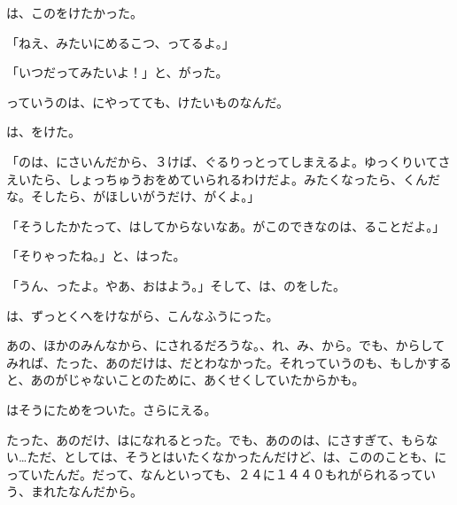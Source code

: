 は、このをけたかった。

「ねえ、みたいにめるこつ、ってるよ。」

「いつだってみたいよ！」と、がった。

っていうのは、にやってても、けたいものなんだ。

は、をけた。

「のは、にさいんだから、３けば、ぐるりっとってしまえるよ。ゆっくりいてさえいたら、しょっちゅうおをめていられるわけだよ。みたくなったら、くんだな。そしたら、がほしいがうだけ、がくよ。」

「そうしたかたって、はしてからないなあ。がこのできなのは、ることだよ。」

「そりゃったね。」と、はった。

「うん、ったよ。やあ、おはよう。」そして、は、のをした。

は、ずっとくへをけながら、こんなふうにった。

あの、ほかのみんなから、にされるだろうな。、れ、み、から。でも、からしてみれば、たった、あのだけは、だとわなかった。それっていうのも、もしかすると、あのがじゃないことのために、あくせくしていたからかも。

はそうにためをついた。さらにえる。

たった、あのだけ、はになれるとった。でも、あののは、にさすぎて、もらない…ただ、としては、そうとはいたくなかったんだけど、は、こののことも、にっていたんだ。だって、なんといっても、２４に１４４０もれがられるっていう、まれたなんだから。


